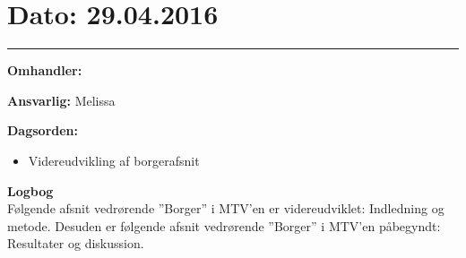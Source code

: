 \section{Dato: 29.04.2016}
\hrule

\textbf{Omhandler:}

\textbf{Ansvarlig:} Melissa

\textbf{Dagsorden:}
\begin{itemize}
	\item Videreudvikling af borgerafsnit
\end{itemize}

\textbf{Logbog}
\\
Følgende afsnit vedrørende ”Borger” i MTV’en er videreudviklet: Indledning og metode. Desuden er følgende afsnit vedrørende ”Borger” i MTV’en påbegyndt: Resultater og diskussion. 
\\ \\



